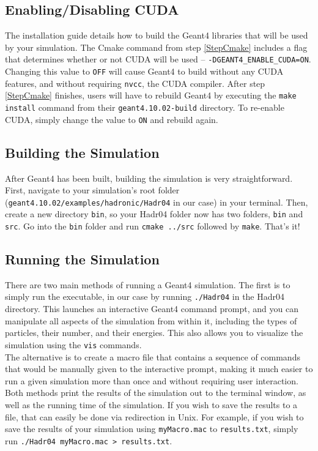 \documentclass[12pt]{article}
\begin{document}
\subsection{Enabling/Disabling CUDA} %
The installation guide details how to build the Geant4 libraries that will be used by your simulation. The Cmake command from step \ref{StepCmake} includes a flag that determines whether or not CUDA will be used -- \texttt{-DGEANT4\_ENABLE\_CUDA=ON}. Changing this value to \texttt{OFF} will cause Geant4 to build without any CUDA features, and without requiring \texttt{nvcc}, the CUDA compiler. After step \ref{StepCmake} finishes, users will have to rebuild Geant4 by executing the \texttt{make install} command from their \texttt{geant4.10.02-build} directory. To re-enable CUDA, simply change the value to \texttt{ON} and rebuild again.

\subsection{Building the Simulation} %
After Geant4 has been built, building the simulation is very straightforward. First, navigate to your simulation's root folder (\texttt{geant4.10.02/examples/hadronic/Hadr04} in our case) in your terminal. Then, create a new directory \texttt{bin}, so your Hadr04 folder now has two folders, \texttt{bin} and \texttt{src}. Go into the \texttt{bin} folder and run \texttt{cmake ../src} followed by \texttt{make}. That's it!

\subsection{Running the Simulation} %
There are two main methods of running a Geant4 simulation. The first is to simply run the executable, in our case by running \texttt{./Hadr04} in the Hadr04 directory. This launches an interactive Geant4 command prompt, and you can manipulate all aspects of the simulation from within it, including the types of particles, their number, and their energies. This also allows you to visualize the simulation using the \texttt{vis} commands.\\

The alternative is to create a macro file that contains a sequence of commands that would be manually given to the interactive prompt, making it much easier to run a given simulation more than once and without requiring user interaction. Both methods print the results of the simulation out to the terminal window, as well as the running time of the simulation. If you wish to save the results to a file, that can easily be done via redirection in Unix. For example, if you wish to save the results of your simulation using \texttt{myMacro.mac} to \texttt{results.txt}, simply run \texttt{./Hadr04 myMacro.mac > results.txt}.
\end{document}

